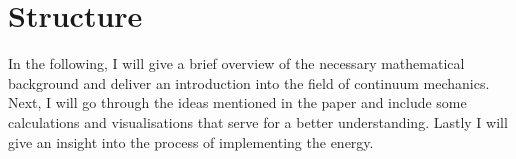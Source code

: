 \section{Structure}
In the following, I will give a brief overview of the necessary mathematical background and deliver an introduction into the field of continuum mechanics. Next, I will go through the ideas mentioned in the paper and include some calculations and visualisations that serve for a better understanding. Lastly I will give an insight into the process of implementing the energy.